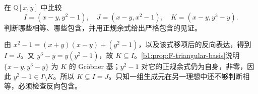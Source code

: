 \begin{exercise}\label{b1:ex:F-ideal-comparisons}
	在 \(\mathbb Q[x,y]\) 中比较
	\[
		I=(x-y,y^2-1),\quad J=(x-y,x^2-1),\quad K=(x-y,y^3-y).
	\]
	判断哪些相等、哪些包含，并用正规余式给出严格包含的见证。
\end{exercise}
\begin{solution}
	由 \(x^2-1=(x+y)(x-y)+(y^2-1)\)，以及该式移项后的反向表达，得到 \(I=J\)。又 \(y^3-y=y(y^2-1)\)，故 \(K\subseteq I\)。\cref{b1:prop:F-triangular-basis}说明 \(\{x-y,y^3-y\}\) 为 \(K\) 的 Gröbner 基；\(y^2-1\) 对它的正规余式仍为自身，非零，因此 \(y^2-1\in I\setminus K\)。所以 \(K\subsetneq I=J\)。只知一组生成元在另一理想中还不够判断相等，必须检查反向包含。
\end{solution}
